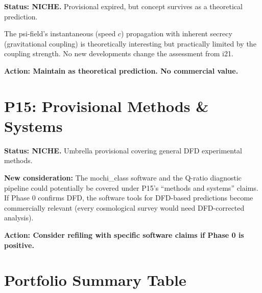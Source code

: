 \documentclass[11pt]{article}
\begin{document}
\textbf{Status: NICHE.}  Provisional expired, but concept survives
as a theoretical prediction.

The psi-field's instantaneous (speed $c$) propagation with inherent
secrecy (gravitational coupling) is theoretically interesting but
practically limited by the coupling strength.  No new developments
change the assessment from i21.

\textbf{Action: Maintain as theoretical prediction.  No commercial value.}


\section{P15: Provisional Methods \& Systems}

\textbf{Status: NICHE.}  Umbrella provisional covering general
DFD experimental methods.

\textbf{New consideration:}  The mochi\_class software and the
Q-ratio diagnostic pipeline could potentially be covered under P15's
``methods and systems'' claims.  If Phase 0 confirms DFD, the software
tools for DFD-based predictions become commercially relevant (every
cosmological survey would need DFD-corrected analysis).

\textbf{Action: Consider refiling with specific software claims if
Phase 0 is positive.}


\section{Portfolio Summary Table}
\end{document}
